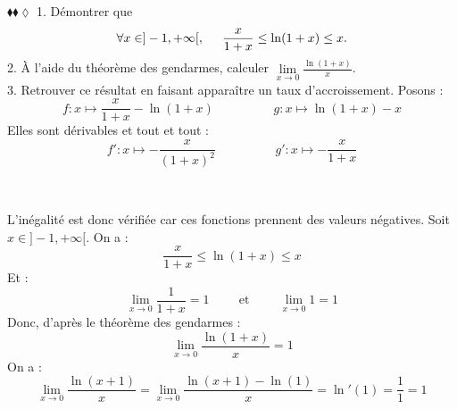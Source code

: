 \documentclass[11pt]{article}
\begin{document}
\begin{exercice}{$\blacklozenge\blacklozenge\lozenge$}{}
    1. Démontrer que
    \begin{equation*}
        \forall x\in]-1,+\infty[, \hspace{0.5cm} \frac{x}{1+x}\leq\ln(1+x)\leq x.
    \end{equation*}
    2. À l'aide du théorème des gendarmes, calculer $\lim\limits_{x\rightarrow0}{\frac{\ln(1+x)}{x}}$.\\
    3. Retrouver ce résultat en faisant apparaître un taux d'accroissement.
    \tcblower
     Posons :
    \begin{equation*}
        f:x\mapsto\frac{x}{1+x}-\ln(1+x) \hspace{2cm} g:x\mapsto\ln(1+x)-x
    \end{equation*}
    Elles sont dérivables et tout et tout :
    \begin{equation*}
        f':x\mapsto-\frac{x}{(1+x)^2} \hspace{2cm} g':x\mapsto-\frac{x}{1+x}
    \end{equation*}
    \begin{center}
        \\[0.25cm]
    \end{center}
    L'inégalité est donc vérifiée car ces fonctions prennent des valeurs négatives.\n
     Soit $x\in]-1,+\infty[$. On a :
    \begin{equation*}
        \frac{x}{1+x}\leq\ln(1+x)\leq x
    \end{equation*}
    Et :
    \begin{equation*}
        \lim_{x\rightarrow0}\frac{1}{1+x}=1 \hspace{1cm} \text{et} \hspace{1cm} \lim_{x\rightarrow0}1=1
    \end{equation*}
    Donc, d'après le théorème des gendarmes :
   \begin{equation*}
        \lim_{x\rightarrow0}\frac{\ln(1+x)}{x}=1
   \end{equation*}
   On a :
   \begin{equation*}
        \lim_{x\rightarrow0}\frac{\ln(x+1)}{x}=\lim_{x\rightarrow0}\frac{\ln(x+1)-\ln(1)}{x}=\ln'(1)=\frac{1}{1}=1
   \end{equation*}
\end{exercice}
\end{document}
